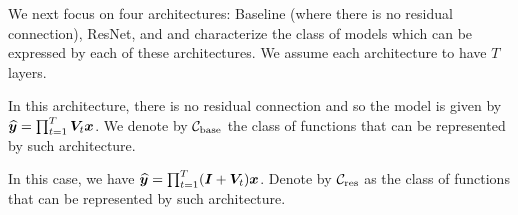We next focus on four architectures: Baseline (where there is no residual connection), ResNet, \GenA{} and \GenB{} and characterize the class of models which can be expressed by each of these architectures. We assume each architecture to have $T$ layers.

 In this architecture, there is no residual connection and so the model is given by $\widehat{\bm{y}} = \prod_{t=1}^T {\bm{V}}_t \bm{x}$. We denote by $\mathcal{C}_{{\rm base}}$ the class of functions that can be represented by such architecture. 



 In this case, we have $\widehat{\bm{y}} = \prod_{t=1}^T (\bm{I} + {\bm{V}}_t)\bm{x}$. Denote by $\mathcal{C}_{{\rm res}}$ as the class of functions that can be represented by such architecture.
%
%


